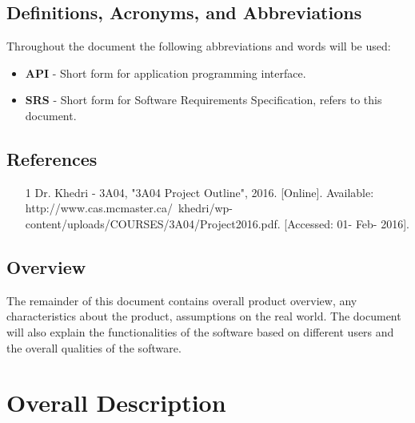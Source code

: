 \documentclass[titlepage]{article}
\begin{document}
		\subsection{Definitions, Acronyms, and Abbreviations}
		\label{sub:definitions_acronyms_and_abbreviations}
		Throughout  the document the following abbreviations and words will be used:
		\begin{itemize}
			\item \textbf{API} - Short form for application programming interface.
			\item \textbf{SRS} - Short form for Software Requirements Specification, refers to this document.
		\end{itemize}
		
		\subsection{References}
		\label{sub:references}
		\begin{enumerate}[a)]
			\item [1] Dr. Khedri - 3A04, "3A04 Project Outline", 2016. [Online]. Available: http://www.cas.mcmaster.ca/~khedri/wp-content/uploads/COURSES/3A04/Project2016.pdf. [Accessed: 01- Feb- 2016].
		\end{enumerate}
		
		\subsection{Overview}
		\label{sub:overview}
		The remainder of this document contains overall product overview, any characteristics about the product, assumptions on the real world. The document will also explain the functionalities of the software based on different users and the overall qualities of the software.  
		
		
		
		\section{Overall Description}
		\label{sec:overall_description}
		
\end{document}
